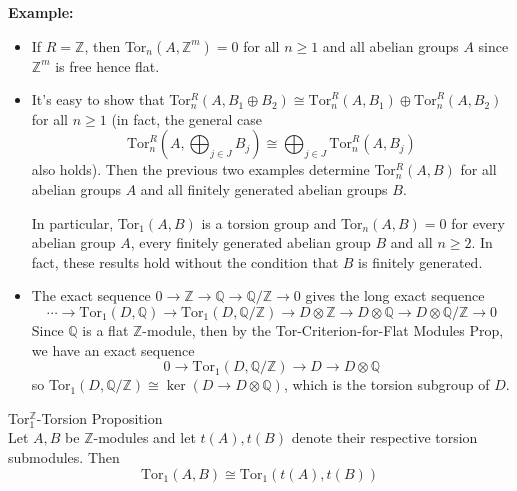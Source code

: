 \noindent\textbf{Example:} \begin{itemize}
    \item If $R=\mathbb{Z}$, then Tor$_n(A,\mathbb{Z}^m)=0$ for all $n\geq 1$ and all abelian groups $A$ since $\mathbb{Z}^m$ is free hence flat.
    \item It's easy to show that Tor$_n^R (A,B_1 \oplus B_2) \cong \text{Tor}_n^R (A,B_1) \oplus \text{Tor}_n^R (A,B_2)$ for all $n\geq 1$ (in fact, the general case
    \[
    \text{Tor}_n^R (A, \bigoplus_{j\in J} B_j) \cong \bigoplus_{j\in J} \text{Tor}_n^R  (A,B_j)
    \]
    also holds). Then the previous two examples determine Tor$_n^R(A,B)$ for all abelian groups $A$ and all finitely generated abelian groups $B$.
    
    In particular, Tor$_1 (A,B)$ is a torsion group and Tor$_n(A,B)=0$ for every abelian group $A$, every finitely generated abelian group $B$ and all $n\geq 2$. In fact, these results hold without the condition that $B$ is finitely generated.

    \item The exact sequence $0\to \mathbb{Z}\to \mathbb{Q} \to \mathbb{Q}/\mathbb{Z} \to0$ gives the long exact sequence
    \[
    \cdots\to \text{Tor}_1(D,\mathbb{Q}) \to \text{Tor}_1 (D,\mathbb{Q}/\mathbb{Z}) \to D\otimes \mathbb{Z} \to D\otimes \mathbb{Q} \to D\otimes \mathbb{Q}/\mathbb{Z} \to 0
    \]
    Since $\mathbb{Q}$ is a flat $\mathbb{Z}$-module, then by the Tor-Criterion-for-Flat Modules Prop, we have an exact sequence
    \[
    0\to \text{Tor}_1 (D,\mathbb{Q}/\mathbb{Z} )\to D\to D\otimes \mathbb{Q}
    \]
    so Tor$_1 (D,\mathbb{Q}/ \mathbb{
    Z
    }) \cong \ker (D\to D\otimes \mathbb{Q})$, which is the torsion subgroup of $D$.
\end{itemize}

\begin{proposition}{Tor$_1^\mathbb{Z}$-Torsion Proposition}\\
Let $A,B$ be $\mathbb{Z}$-modules and let $t(A),t(B)$ denote their respective torsion submodules. Then
\[
\text{Tor}_1 (A,B) \cong \text{Tor}_1 (t(A),t(B))
\]
\end{proposition}

